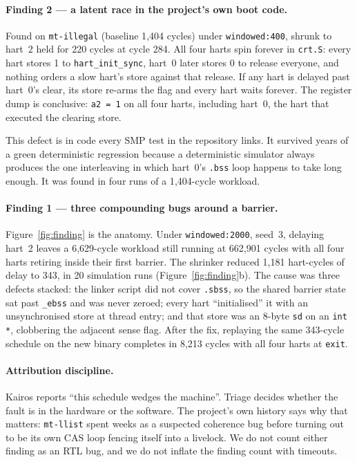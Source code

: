 \documentclass[sigconf,anonymous,review]{acmart}
\begin{document}
\paragraph{Finding 2 --- a latent race in the project's own boot code.}
Found on \texttt{mt-illegal} (baseline 1{,}404 cycles) under
\texttt{windowed:400}, shrunk to hart~2 held for 220 cycles at
cycle 284. All four harts spin forever in \texttt{crt.S}: every hart
stores 1 to \texttt{hart\_init\_sync}, hart~0 later stores 0 to
release everyone, and nothing orders a slow hart's store against that
release. If any hart is delayed past hart~0's clear, its store re-arms
the flag and every hart waits forever. The register dump is
conclusive: \texttt{a2 = 1} on all four harts, including hart~0, the
hart that executed the clearing store.

This defect is in code every SMP test in the repository links. It
survived years of a green deterministic regression because a
deterministic simulator always produces the one interleaving in which
hart~0's \texttt{.bss} loop happens to take long enough. It was found
in four runs of a 1{,}404-cycle workload.

\paragraph{Finding 1 --- three compounding bugs around a barrier.}
Figure~\ref{fig:finding} is the anatomy. Under \texttt{windowed:2000},
seed~3, delaying hart~2 leaves a 6{,}629-cycle workload still running
at 662{,}901 cycles with all four harts retiring inside their first
barrier. The shrinker reduced 1{,}181 hart-cycles of delay to 343, in
20 simulation runs (Figure~\ref{fig:finding}b). The cause was three
defects stacked: the linker script did not cover \texttt{.sbss}, so
the shared barrier state sat past \texttt{\_ebss} and was never
zeroed; every hart ``initialised'' it with an unsynchronised store at
thread entry; and that store was an 8-byte \texttt{sd} on an
\texttt{int *}, clobbering the adjacent sense flag. After the fix,
replaying the same 343-cycle schedule on the new binary completes in
8{,}213 cycles with all four harts at \texttt{exit}.

\paragraph{Attribution discipline.}
Kairos reports ``this schedule wedges the machine''. Triage decides
whether the fault is in the hardware or the software. The project's
own history says why that matters: \texttt{mt-llist} spent weeks as a
suspected coherence bug before turning out to be its own CAS loop
fencing itself into a livelock. We do not count either finding as an
RTL bug, and we do not inflate the finding count with timeouts.
\end{document}
